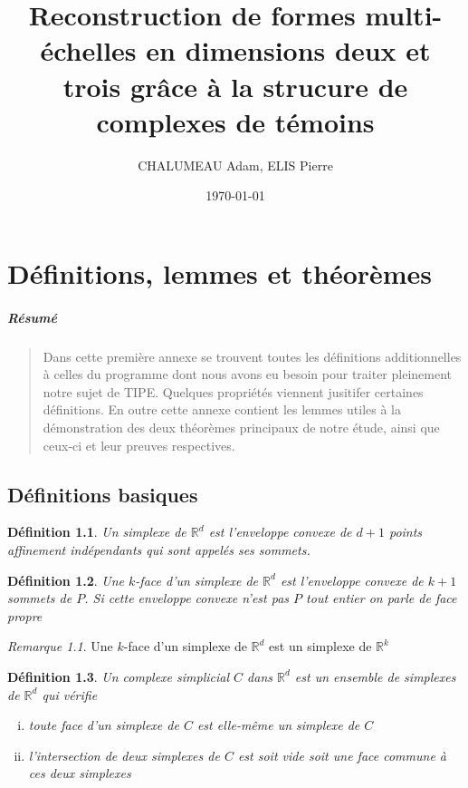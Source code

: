 \documentclass{report}
\title{\textbf{Reconstruction de formes multi-échelles en dimensions deux et trois grâce à la strucure de complexes de témoins}}
\author{CHALUMEAU Adam,	ELIS Pierre}
\date{\today}
\newcommand{\R}{\mathbb{R}}
\newtheorem{definition}{Définition}
\theoremstyle{remark}
\newtheorem*{rmq}{Remarque}
\begin{document}
\maketitle

\appendix
\chapter{Définitions, lemmes et théorèmes}
\paragraph{Résumé}
\begin{quote}
{\small Dans cette première annexe se trouvent toutes les définitions additionnelles à celles du programme dont nous avons eu besoin pour traiter pleinement notre sujet de TIPE. Quelques propriétés viennent jusitifer certaines définitions. En outre cette annexe contient les lemmes utiles à la démonstration des deux théorèmes principaux de notre étude, ainsi que ceux-ci et leur preuves respectives.}
\end{quote}

\section{Définitions basiques}
\begin{definition}
	Un \textnormal{simplexe} de $\R^d$ est l'enveloppe convexe de $d+1$ points affinement indépendants qui sont appelés ses sommets.
\end{definition}

\begin{definition}
	Une \textnormal{$k$-face} d'un simplexe de $\R^d$ est l'enveloppe convexe de $k+1$ sommets de $P$. Si cette enveloppe convexe n'est pas $P$ tout entier on parle de \textnormal{face propre}
\end{definition}

\begin{rmq} 
	Une $k$-face d'un simplexe de $\R^d$ est un simplexe de $\R^k$
\end{rmq}

\begin{definition}
	Un \textnormal{complexe simplicial} $C$ dans $\R^d$ est un ensemble de simplexes de $\R^d$ qui vérifie
	\begin{enumerate}[(i)]
		\item toute face d'un simplexe de $C$ est elle-même un simplexe de $C$
		\item l'intersection de deux simplexes de $C$ est soit vide soit une face commune à ces deux simplexes
	\end{enumerate}
\end{definition}
\end{document}
